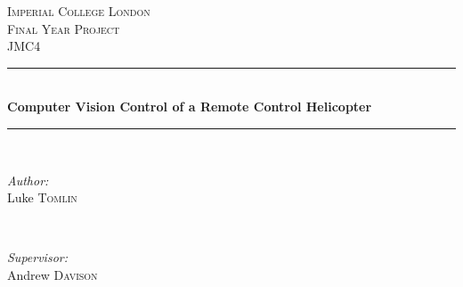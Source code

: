 \begin{titlepage}

\newcommand{\HRule}{\rule{\linewidth}{0.5mm}} %

\center %
 

 \textsc{\LARGE Imperial College London}\\[1.5cm] %
 \textsc{\Large Final Year Project}\\[0.5cm] %
 \textsc{\large JMC4}\\[0.5cm] %


 \HRule \\[0.4cm]
 { \huge \bfseries Computer Vision Control of a Remote Control Helicopter}\\[0.4cm] %
 \HRule \\[1.5cm]
  

  \begin{minipage}{0.4\textwidth}
  \begin{flushleft} \large
  \emph{Author:}\\
  Luke \textsc{Tomlin} %
  \end{flushleft}
  \end{minipage}
  ~
  \begin{minipage}{0.4\textwidth}
  \begin{flushright} \large
  \emph{Supervisor:} \\
  Andrew  \textsc{Davison} %
  \end{flushright}
  \end{minipage}\\[4cm]



\end{titlepage}
